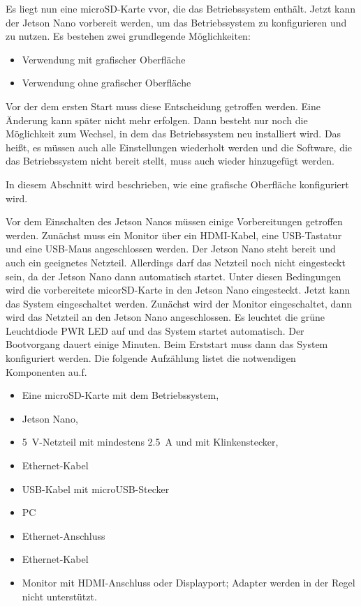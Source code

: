 Es liegt nun eine microSD-Karte vvor, die das Betriebssystem enthält. Jetzt kann der Jetson Nano vorbereit werden, um das Betriebssystem zu konfigurieren und zu nutzen. Es bestehen zwei grundlegende Möglichkeiten:

\begin{itemize}
    \item Verwendung mit grafischer Oberfläche
    \item Verwendung ohne grafischer Oberfläche
\end{itemize}

Vor der dem ersten Start muss diese Entscheidung getroffen werden. Eine Änderung kann später nicht mehr erfolgen. Dann besteht nur noch die Möglichkeit zum Wechsel, in dem das Betriebssystem neu installiert wird. Das heißt, es müssen auch alle Einstellungen wiederholt werden und die Software, die das Betriebssystem nicht bereit stellt, muss auch wieder hinzugefügt werden.

\bigskip

In diesem Abschnitt wird beschrieben, wie eine grafische Oberfläche konfiguriert wird.

\bigskip

Vor dem Einschalten des Jetson Nanos müssen einige Vorbereitungen getroffen werden. Zunächst muss ein Monitor über ein HDMI-Kabel, eine USB-Tastatur und eine USB-Maus angeschlossen werden. Der Jetson Nano steht bereit und auch ein geeignetes Netzteil. Allerdings darf das Netzteil noch nicht eingesteckt sein, da der Jetson Nano dann automatisch startet. Unter diesen Bedingungen wird die vorbereitete micorSD-Karte in den Jetson Nano eingesteckt. Jetzt kann das System eingeschaltet werden. Zunächst wird der Monitor eingeschaltet, dann wird das Netzteil an den Jetson Nano angeschlossen. Es leuchtet die grüne Leuchtdiode PWR LED auf und das System startet automatisch. Der Bootvorgang dauert einige Minuten. Beim Erststart muss dann das System konfiguriert werden. Die folgende Aufzählung listet die notwendigen Komponenten au.f.

\begin{itemize}
	\item Eine microSD-Karte mit dem Betriebssystem,
	\item Jetson Nano,
	\item \SI{5}{\volt}-Netzteil mit mindestens \SI{2.5}{\ampere} und mit Klinkenstecker,
	\item Ethernet-Kabel
	\item USB-Kabel mit microUSB-Stecker
	\item PC
	\item Ethernet-Anschluss
	\item Ethernet-Kabel
	\item Monitor mit HDMI-Anschluss oder Displayport; Adapter werden in der Regel  nicht unterstützt.
\end{itemize}


